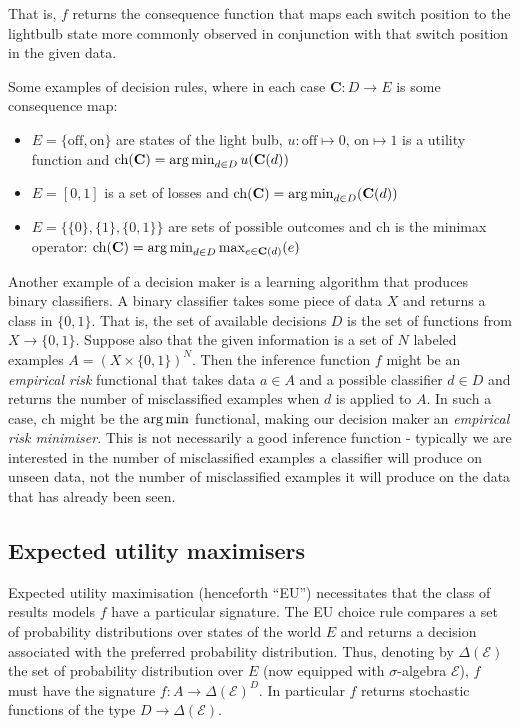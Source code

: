 That is, $f$ returns the consequence function that maps each switch position to the lightbulb state more commonly observed in conjunction with that switch position in the given data.

Some examples of decision rules, where in each case $\mathbf{C}:D\to E$ is some consequence map:
\begin{itemize}
	\item $E=\{\mathrm{off},\mathrm{on}\}$ are states of the light bulb, $u:\mathrm{off}\mapsto 0$, $\mathrm{on}\mapsto 1$ is a utility function and $\mathrm{ch}(\mathbf{C}) = \operatorname*{arg\,min}_{d\in D} u(\mathbf{C}(d))$ 
	\item $E=[0,1]$ is a set of losses and $\mathrm{ch}(\mathbf{C}) = \operatorname*{arg\,min}_{d\in D} (\mathbf{C}(d))$
	\item $E=\{\{0\},\{1\},\{0,1\}\}$ are sets of possible outcomes and $\mathrm{ch}$ is the minimax operator: $\mathrm{ch}(\mathbf{C}) = \operatorname*{arg\,min}_{d\in D}\max_{e\in \mathbf{C}(d)} (e)$
\end{itemize}

Another example of a decision maker is a learning algorithm that produces binary classifiers. A binary classifier takes some piece of data $X$ and returns a class in $\{0,1\}$. That is, the set of available decisions $D$ is the set of functions from $X\to\{0,1\}$. Suppose also that the given information is a set of $N$ labeled examples $A=(X\times\{0,1\})^N$. Then the inference function $f$ might be an \emph{empirical risk} functional that takes data $a\in A$ and a possible classifier $d\in D$ and returns the number of misclassified examples when $d$ is applied to $A$. In such a case, $\mathrm{ch}$ might be the $\operatorname*{arg\,min}$ functional, making our decision maker an \emph{empirical risk minimiser}. This is not necessarily a good inference function - typically we are interested in the number of misclassified examples a classifier will produce on unseen data, not the number of misclassified examples it will produce on the data that has already been seen.

\subsection{Expected utility maximisers}


Expected utility maximisation (henceforth ``EU'') necessitates that the class of results models $f$ have a particular signature. The EU choice rule compares a set of probability distributions over states of the world $E$ and returns a decision associated with the preferred probability distribution. Thus, denoting by $\Delta(\mathcal{E})$ the set of probability distribution over $E$ (now equipped with $\sigma$-algebra $\mathcal{E}$), $f$ must have the signature $f:A\to \Delta(\mathcal{E})^D$. In particular $f$ returns stochastic functions of the type $D\to \Delta(\mathcal{E})$.


